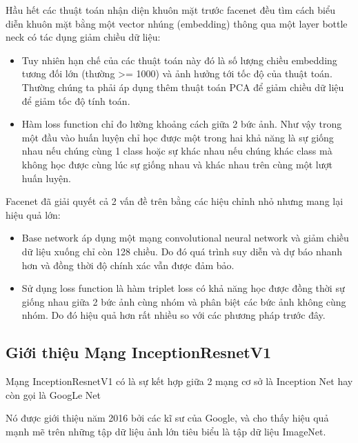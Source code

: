 Hầu hết các thuật toán nhận diện khuôn mặt trước facenet đều tìm cách biểu diễn
khuôn mặt bằng một vector nhúng (embedding) thông qua một layer bottle neck có tác dụng
giảm chiều dữ liệu:

\begin{itemize}
    \item Tuy nhiên hạn chế của các thuật toán này đó là số lượng chiều embedding
          tương đối lớn (thường >= 1000) và ảnh hưởng tới tốc độ của thuật toán.
          Thường chúng ta phải áp dụng thêm thuật toán PCA để giảm chiều dữ liệu để giảm
          tốc độ tính toán.
    \item Hàm loss function chỉ đo lường khoảng cách giữa 2 bức ảnh.
          Như vậy trong một đầu vào huấn luyện chỉ học được một trong hai khả năng
          là sự giống nhau nếu chúng cùng 1 class hoặc sự khác nhau nếu chúng khác
          class mà không học được cùng lúc sự giống nhau và khác nhau trên cùng một
          lượt huấn luyện.
\end{itemize}

Facenet đã giải quyết cả 2 vấn đề trên bằng các hiệu chỉnh nhỏ nhưng mang lại hiệu quả lớn:

\begin{itemize}
    \item Base network áp dụng một mạng convolutional neural network và giảm chiều dữ
          liệu xuống chỉ còn 128 chiều. Do đó quá trình suy diễn và dự báo nhanh hơn và
          đồng thời độ chính xác vẫn được đảm bảo.
    \item Sử dụng loss function là hàm triplet loss có khả năng học được đồng thời
          sự giống nhau giữa 2 bức ảnh cùng nhóm và phân biệt các bức ảnh không cùng nhóm.
          Do đó hiệu quả hơn rất nhiều so với các phương pháp trước đây.
\end{itemize}

\newpage
\subsection{Giới thiệu Mạng InceptionResnetV1}

Mạng InceptionResnetV1 có là sự kết hợp giữa 2 mạng cơ sở là Inception Net hay còn gọi là GoogLe Net

Nó được giới thiệu năm 2016 bởi các kĩ sư của Google, và cho thấy hiệu quả mạnh mẽ trên những tập dữ liệu ảnh lớn
tiêu biểu là tập dữ liệu ImageNet.

